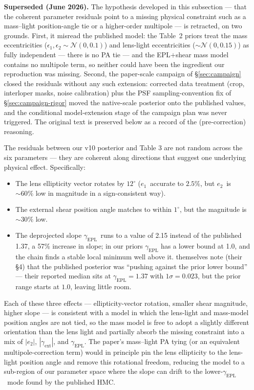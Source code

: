 \documentclass[11pt,letterpaper]{article}
\newcommand{\gammaEPL}{\ensuremath{\gamma_{\mathrm{EPL}}}}
\newcommand{\gext}{\ensuremath{\gamma_{\mathrm{ext}}}}
\newcommand{\eone}{\ensuremath{e_{1}}}
\newcommand{\etwo}{\ensuremath{e_{2}}}
\begin{document}
{\bf Superseded (June 2026).} The hypothesis developed in this
subsection --- that the coherent parameter residuals point to a missing
physical constraint such as a mass--light position-angle tie or a
higher-order multipole --- is retracted, on two grounds. First, it
misread the published model: the \citet{huang2025foundry1} Table~2
priors treat the mass eccentricities ($\epsilon_1,\epsilon_2 \sim
\mathcal{N}(0,0.1)$) and lens-light eccentricities
($\sim\mathcal{N}(0,0.15)$) as fully independent --- there is no PA tie
--- and the EPL$+$shear mass model contains no multipole term, so
neither could have been the ingredient our reproduction was missing.
Second, the paper-scale campaign of \S\ref{sec:campaign} closed the
residuals without any such extension: corrected data treatment (crop,
interloper masks, noise calibration) plus the PSF sampling-convention
fix of \S\ref{sec:campaign-rigor} moved the native-scale posterior onto
the published values, and the conditional model-extension stage of the
campaign plan was never triggered. The original text is preserved below
as a record of the (pre-correction) reasoning.

The residuals between our v10 posterior and \citet{huang2025foundry1}
Table 3 are not random across the six parameters --- they are coherent
along directions that suggest one underlying physical effect. Specifically:
\begin{itemize}
\item The lens ellipticity vector rotates by $12^{\circ}$
(\eone\ accurate to $2.5\%$, but \etwo\ is $\sim 60\%$ low in magnitude
in a sign-consistent way).
\item The external shear position angle matches to within $1^{\circ}$,
but the magnitude is $\sim 30\%$ low.
\item The deprojected slope \gammaEPL\ runs to a value of 2.15 instead
of the published 1.37, a 57\% increase in slope; in our priors
$\gammaEPL$ has a lower bound at 1.0, and the chain finds a stable
local minimum well above it. \citet{huang2025foundry1} themselves
note (their \S 4) that the published posterior was ``pushing
against the prior lower bound'' --- their reported median sits at
$\gammaEPL=1.37$ with $1\sigma=0.023$, but the prior range starts at
$1.0$, leaving little room.
\end{itemize}
Each of these three effects --- ellipticity-vector rotation, smaller
shear magnitude, higher slope --- is consistent with a model in which
the lens-light and mass-model position angles are not tied, so the
mass model is free to adopt a slightly different orientation than
the lens light and partially absorb the missing constraint into a
mix of $|\etwo|$, $|\gext|$, and \gammaEPL. The paper's mass--light PA
tying (or an equivalent multipole-correction term) would in principle
pin the lens ellipticity to the lens-light position angle and remove
this rotational freedom, reducing the model to a sub-region of our
parameter space where the slope can drift to the lower-\gammaEPL\
mode found by the published HMC.
\end{document}
